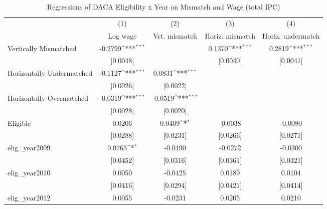 \begin{table}[htbp]\centering
\def\sym#1{\ifmmode^{#1}\else\(^{#1}\)\fi}
\caption{Regressions of DACA Eligibility x Year on Mismatch and Wage (total IPC)}
\begin{tabular}{l*{4}{c}}
\toprule
                    &\multicolumn{1}{c}{(1)}         &\multicolumn{1}{c}{(2)}         &\multicolumn{1}{c}{(3)}         &\multicolumn{1}{c}{(4)}         \\
                    &    Log wage         &Vrt. mismatch         &Horiz. mismatch         &Horiz. undermatch         \\
\midrule
Vertically Mismatched&     -0.2799\sym{***}&                     &      0.1370\sym{***}&      0.2819\sym{***}\\
                    &    [0.0048]         &                     &    [0.0040]         &    [0.0041]         \\
\addlinespace
Horizontally Undermatched&     -0.1127\sym{***}&      0.0831\sym{***}&                     &                     \\
                    &    [0.0026]         &    [0.0022]         &                     &                     \\
\addlinespace
Horizontally Overmatched&     -0.0319\sym{***}&     -0.0519\sym{***}&                     &                     \\
                    &    [0.0028]         &    [0.0020]         &                     &                     \\
\addlinespace
Eligible            &      0.0206         &      0.0409\sym{*}  &     -0.0038         &     -0.0080         \\
                    &    [0.0288]         &    [0.0231]         &    [0.0266]         &    [0.0271]         \\
\addlinespace
elig\_year2009       &      0.0765\sym{*}  &     -0.0490         &     -0.0272         &     -0.0300         \\
                    &    [0.0452]         &    [0.0316]         &    [0.0361]         &    [0.0321]         \\
\addlinespace
elig\_year2010       &      0.0050         &     -0.0425         &      0.0189         &      0.0104         \\
                    &    [0.0416]         &    [0.0294]         &    [0.0421]         &    [0.0414]         \\
\addlinespace
elig\_year2012       &      0.0055         &     -0.0231         &      0.0205         &      0.0210         \\

\end{tabular}
\end{table}
